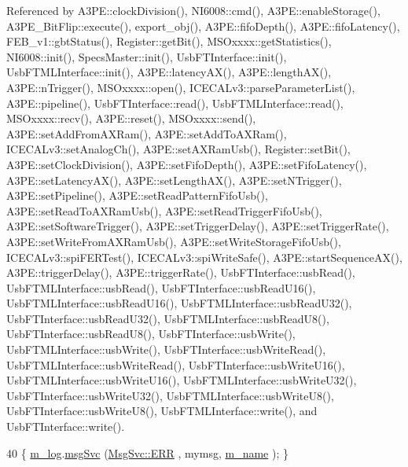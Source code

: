 Referenced by A3\+P\+E\+::clock\+Division(), N\+I6008\+::cmd(), A3\+P\+E\+::enable\+Storage(), A3\+P\+E\+\_\+\+Bit\+Flip\+::execute(), export\+\_\+obj(), A3\+P\+E\+::fifo\+Depth(), A3\+P\+E\+::fifo\+Latency(), F\+E\+B\+\_\+v1\+::gbt\+Status(), Register\+::get\+Bit(), M\+S\+Oxxxx\+::get\+Statistics(), N\+I6008\+::init(), Specs\+Master\+::init(), Usb\+F\+T\+Interface\+::init(), Usb\+F\+T\+M\+L\+Interface\+::init(), A3\+P\+E\+::latency\+A\+X(), A3\+P\+E\+::length\+A\+X(), A3\+P\+E\+::n\+Trigger(), M\+S\+Oxxxx\+::open(), I\+C\+E\+C\+A\+Lv3\+::parse\+Parameter\+List(), A3\+P\+E\+::pipeline(), Usb\+F\+T\+Interface\+::read(), Usb\+F\+T\+M\+L\+Interface\+::read(), M\+S\+Oxxxx\+::recv(), A3\+P\+E\+::reset(), M\+S\+Oxxxx\+::send(), A3\+P\+E\+::set\+Add\+From\+A\+X\+Ram(), A3\+P\+E\+::set\+Add\+To\+A\+X\+Ram(), I\+C\+E\+C\+A\+Lv3\+::set\+Analog\+Ch(), A3\+P\+E\+::set\+A\+X\+Ram\+Usb(), Register\+::set\+Bit(), A3\+P\+E\+::set\+Clock\+Division(), A3\+P\+E\+::set\+Fifo\+Depth(), A3\+P\+E\+::set\+Fifo\+Latency(), A3\+P\+E\+::set\+Latency\+A\+X(), A3\+P\+E\+::set\+Length\+A\+X(), A3\+P\+E\+::set\+N\+Trigger(), A3\+P\+E\+::set\+Pipeline(), A3\+P\+E\+::set\+Read\+Pattern\+Fifo\+Usb(), A3\+P\+E\+::set\+Read\+To\+A\+X\+Ram\+Usb(), A3\+P\+E\+::set\+Read\+Trigger\+Fifo\+Usb(), A3\+P\+E\+::set\+Software\+Trigger(), A3\+P\+E\+::set\+Trigger\+Delay(), A3\+P\+E\+::set\+Trigger\+Rate(), A3\+P\+E\+::set\+Write\+From\+A\+X\+Ram\+Usb(), A3\+P\+E\+::set\+Write\+Storage\+Fifo\+Usb(), I\+C\+E\+C\+A\+Lv3\+::spi\+F\+E\+R\+Test(), I\+C\+E\+C\+A\+Lv3\+::spi\+Write\+Safe(), A3\+P\+E\+::start\+Sequence\+A\+X(), A3\+P\+E\+::trigger\+Delay(), A3\+P\+E\+::trigger\+Rate(), Usb\+F\+T\+Interface\+::usb\+Read(), Usb\+F\+T\+M\+L\+Interface\+::usb\+Read(), Usb\+F\+T\+Interface\+::usb\+Read\+U16(), Usb\+F\+T\+M\+L\+Interface\+::usb\+Read\+U16(), Usb\+F\+T\+M\+L\+Interface\+::usb\+Read\+U32(), Usb\+F\+T\+Interface\+::usb\+Read\+U32(), Usb\+F\+T\+M\+L\+Interface\+::usb\+Read\+U8(), Usb\+F\+T\+Interface\+::usb\+Read\+U8(), Usb\+F\+T\+Interface\+::usb\+Write(), Usb\+F\+T\+M\+L\+Interface\+::usb\+Write(), Usb\+F\+T\+Interface\+::usb\+Write\+Read(), Usb\+F\+T\+M\+L\+Interface\+::usb\+Write\+Read(), Usb\+F\+T\+Interface\+::usb\+Write\+U16(), Usb\+F\+T\+M\+L\+Interface\+::usb\+Write\+U16(), Usb\+F\+T\+M\+L\+Interface\+::usb\+Write\+U32(), Usb\+F\+T\+Interface\+::usb\+Write\+U32(), Usb\+F\+T\+M\+L\+Interface\+::usb\+Write\+U8(), Usb\+F\+T\+Interface\+::usb\+Write\+U8(), Usb\+F\+T\+M\+L\+Interface\+::write(), and Usb\+F\+T\+Interface\+::write().


\begin{DoxyCode}
40 \{ \hyperlink{classObject_a0d269813dd7ac1f24bc143031e2963f2}{m\_log}.\hyperlink{classMsgSvc_ad25f18047920cc59a314e5098259711c}{msgSvc} (\hyperlink{classMsgSvc_ae671eb7301996cd049d2da8a65925926a35a9d7166e9896af4ec8fb33bf5f1772}{MsgSvc::ERR}     , mymsg, \hyperlink{classObject_a8b83c95c705d2c3ba0d081fe1710f48d}{m\_name} ); \}
\end{DoxyCode}
\mbox{\label{classObject_ad7f6c457733082efa2f9ff5f5c8e119a}} 
